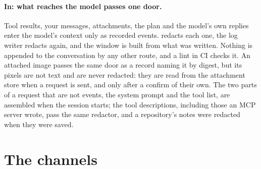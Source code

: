 \paragraph{In: what reaches the model passes one door.} Tool results, your
messages, attachments, the plan and the model's own replies enter the
model's context only as recorded events.  redacts each
one, the log writer redacts again, and the window is built from what was
written. Nothing is appended to the conversation by any other route, and a
lint in CI checks it. An attached image passes the same door as a record
naming it by digest, but its pixels are not text and are never redacted:
they are read from the attachment store when a request is sent, and only
after a confirm of their own. The two parts of a request that are not events, the
system prompt and the tool list, are assembled when the session starts;
the tool descriptions, including those an MCP server wrote, pass the same
redactor, and a repository's notes were redacted when they were saved.

\section{The channels}

